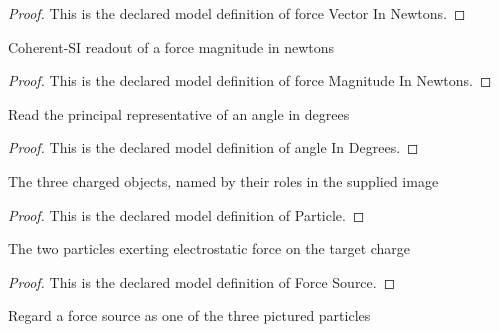 \begin{proof}
  This is the declared model definition of force Vector In Newtons.
\end{proof}
\begin{definition}
  \label{def:physics:phyx-mini-0907:phyxminiproblems-problemphyxmini0907-forcemagnitudeinnewtons}
  Coherent-SI readout of a force magnitude in newtons
\end{definition}
\begin{proof}
  This is the declared model definition of force Magnitude In Newtons.
\end{proof}
\begin{definition}
  \label{def:physics:phyx-mini-0907:phyxminiproblems-problemphyxmini0907-angleindegrees}
  Read the principal representative of an angle in degrees
\end{definition}
\begin{proof}
  This is the declared model definition of angle In Degrees.
\end{proof}
\begin{definition}[Particle]
  \label{def:physics:phyx-mini-0907:phyxminiproblems-problemphyxmini0907-particle}
  The three charged objects, named by their roles in the supplied image
\end{definition}
\begin{proof}
  This is the declared model definition of Particle.
\end{proof}
\begin{definition}
  \label{def:physics:phyx-mini-0907:phyxminiproblems-problemphyxmini0907-forcesource}
  The two particles exerting electrostatic force on the target charge
\end{definition}
\begin{proof}
  This is the declared model definition of Force Source.
\end{proof}
\begin{definition}[to Particle]
  \label{def:physics:phyx-mini-0907:phyxminiproblems-problemphyxmini0907-forcesource-toparticle}
  Regard a force source as one of the three pictured particles
\end{definition}

